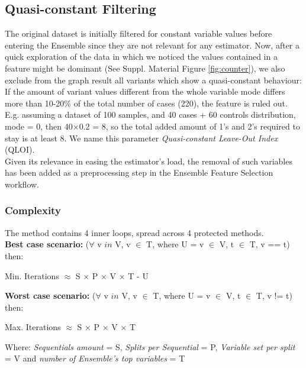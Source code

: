 \subsection{Quasi-constant Filtering}
The original dataset is initially filtered for constant variable values before entering the Ensemble since they are not relevant for any estimator. Now, after a quick exploration of the data in which we noticed the values contained in a feature might be dominant (See Suppl. Material Figure \ref{fig:counter}), we also exclude from the graph result all variants which show a quasi-constant behaviour: If the amount of variant values different from the whole variable mode differs more than 10-20\% of the total number of cases (220), the feature is ruled out. E.g. assuming a dataset of 100 samples, and 40 cases + 60 controls distribution, mode = 0, then 40$\times$0.2 = 8, so the total added amount of 1's and 2's required to stay is at least 8.
We name this parameter \emph{Quasi-constant Leave-Out Index} (QLOI).
\\

Given its relevance in easing the estimator's load, the removal of such variables has been added as a preprocessing step in the Ensemble Feature Selection workflow.

\subsubsection{Complexity}
\label{section:methods:complex}
The method contains 4 inner loops, spread across 4 protected methods.
\\

\textbf{Best case scenario:} ($\forall$ v $in$ V, v  $\in$  T, where U = v  $\in$  V, t  $\in$  T, v == t) then:
\begin{center}
Min. Iterations $\approx$ S $\times$ P $\times$ V $\times$ T - U\\    
\end{center}

\textbf{Worst case scenario:} ($\forall$ v $in$ V, v  $\in$  T, where U = v  $\in$  V, t  $\in$  T, v != t) then:
\begin{center}
Max. Iterations $\approx$ S $\times$ P $\times$ V $\times$ T\\    
\end{center}


Where: \textit{Sequentials amount} = S, \textit{Splits per Sequential} = P, \textit{Variable set per split} = V and \textit{number of Ensemble’s top variables} = T

